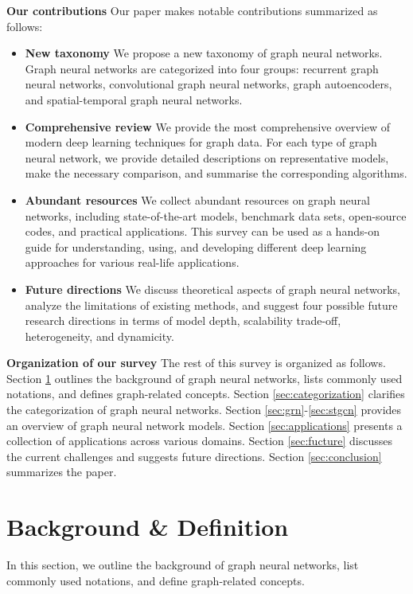 \vspace{.2cm}
\textbf{Our contributions}
Our paper makes notable contributions summarized as follows:
\begin{itemize}
\item \textbf{New taxonomy} We propose a new taxonomy of graph neural networks.  Graph neural networks are categorized into four groups: recurrent graph neural networks, convolutional graph neural networks, graph autoencoders, and spatial-temporal graph neural networks. 

\item \textbf{Comprehensive review} We provide the most comprehensive overview of modern deep learning techniques for graph data. For each type of graph neural network, we provide detailed descriptions on representative models, make the necessary comparison, and summarise the corresponding algorithms.

\item \textbf{Abundant resources} We collect abundant resources on graph neural networks,  including state-of-the-art models, benchmark data sets, open-source codes, and practical applications. This survey can be used as a hands-on guide for understanding, using, and developing different deep learning approaches for various real-life applications. 

\item \textbf{Future directions} We discuss theoretical aspects of graph neural networks, analyze the limitations of existing methods, and suggest four possible future research directions in terms of model depth, scalability trade-off, heterogeneity, and dynamicity.
\end{itemize}
	
\vspace{.2cm}
\textbf{Organization of our survey}
The rest of this survey is organized as follows. Section \ref{sec:definition} outlines the background of graph neural networks, lists commonly used notations, and defines graph-related concepts. Section \ref{sec:categorization} clarifies the categorization of graph neural networks. Section \ref{sec:grn}-\ref{sec:stgcn} provides an overview of graph neural network models. Section \ref{sec:applications} presents a collection of applications across various domains.  Section \ref{sec:fucture} discusses the current challenges and suggests future directions. Section \ref{sec:conclusion} summarizes the paper.
	

\section{Background \& Definition}\label{sec:definition}
In this section, we outline the background of graph neural networks, list commonly used notations, and define graph-related concepts.

